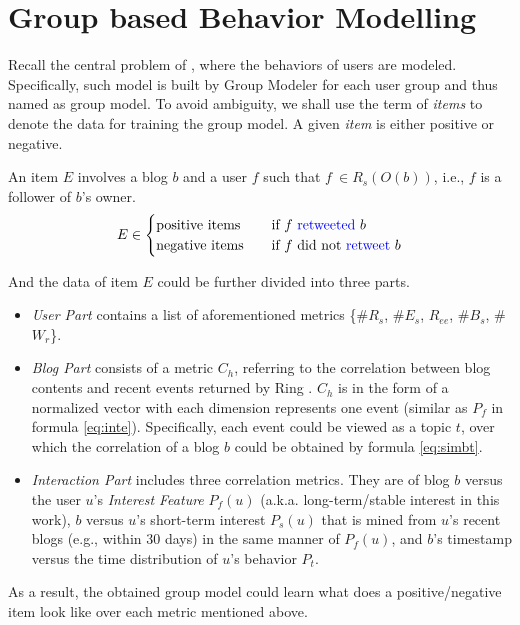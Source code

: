 \section{Group based Behavior Modelling}
\label{sec:gm}


Recall the central problem of \sys{}, where the \retg{} behaviors of users are modeled.
Specifically, such model is built by Group Modeler for each user group and thus named as group model.
To avoid ambiguity, we shall use the term of \textit{items} to denote the data for training the group model.
A given \textit{item} is either positive or negative.

\begin{definition}
\label{def:gm-it}
An item $E$ involves a blog $b$ and a user $f$ such that $f\ \in R_s(O(b))$, i.e., $f$ is a follower of $b$'s owner.
\begin{equation}
\label{eq:gm-it}
E \in
  \begin{cases}
    \text{positive items}       & \quad \text{if } f \text{ \textcolor{blue}{retweeted}{} } b\\
    \text{negative items}  		& \quad \text{if } f \text{ did not \textcolor{blue}{retweet}{} } b
  \end{cases}
\end{equation}
\end{definition}

And the data of item $E$ could be further divided into three parts.
\begin{itemize}
	\item \textit{User Part} contains a list of aforementioned metrics \{\#$R_s$, \#$E_s$, $R_{ee}$, \#$B_s$, \#$W_r$\}.
	\item \textit{Blog Part} consists of a metric $C_h$, referring to the correlation between blog contents and recent events returned by Ring . $C_h$ is in the form of a normalized vector with each dimension represents one event (similar as $P_f$ in formula \ref{eq:inte}). Specifically, each event could be viewed as a topic $t$, over which the correlation of a blog $b$ could be obtained by formula \ref{eq:simbt}.
	\item \textit{Interaction Part} includes three correlation metrics. They are of blog $b$ versus the user $u$'s \textit{Interest Feature} $P_f(u)$ (a.k.a. long-term/stable interest in this work), $b$ versus $u$'s short-term interest $P_s(u)$ that is mined from $u$'s recent blogs (e.g., within 30 days) in the same manner of $P_f(u)$, and $b$'s timestamp versus the time distribution of $u$'s \retg{} behavior $P_t$.
\end{itemize}
As a result, the obtained group model could learn what does a positive/negative item look like over each metric mentioned above.










